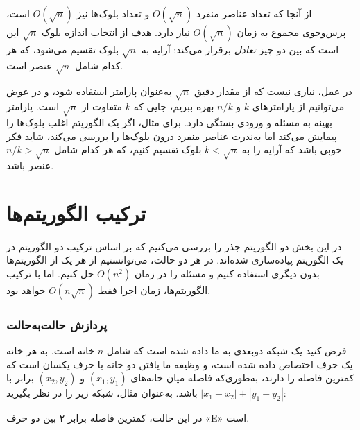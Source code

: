 از آنجا که تعداد عناصر منفرد $O(\sqrt n)$
و تعداد بلوک‌ها نیز $O(\sqrt n)$ است،
پرس‌وجوی مجموع به زمان $O(\sqrt n)$ نیاز دارد.
هدف از انتخاب اندازه بلوک $\sqrt n$ این است
که بین دو چیز \emph{تعادل} برقرار می‌کند:
آرایه به $\sqrt n$ بلوک تقسیم می‌شود،
که هر کدام شامل $\sqrt n$ عنصر است.

در عمل، نیازی نیست که از مقدار دقیق $\sqrt n$
به‌عنوان پارامتر استفاده شود،
و در عوض می‌توانیم از پارامترهای $k$ و $n/k$ بهره ببریم، جایی که $k$
متفاوت از $\sqrt n$ است.
پارامتر بهینه به مسئله و ورودی بستگی دارد.
برای مثال، اگر یک الگوریتم اغلب بلوک‌ها را پیمایش می‌کند
اما به‌ندرت عناصر منفرد درون بلوک‌ها را بررسی می‌کند،
شاید فکر خوبی باشد که آرایه را به
$k < \sqrt n$ بلوک تقسیم کنیم، که هر کدام شامل $n/k > \sqrt n$
عنصر باشد.

\section{ترکیب الگوریتم‌ها}

در این بخش دو الگوریتم جذر را بررسی می‌کنیم
که بر اساس ترکیب دو الگوریتم در یک الگوریتم پیاده‌سازی شده‌اند.
در هر دو حالت، می‌توانستیم از هر یک از الگوریتم‌ها
بدون دیگری استفاده کنیم
و مسئله را در زمان $O(n^2)$ حل کنیم.
اما با ترکیب الگوریتم‌ها، زمان اجرا
فقط $O(n \sqrt n)$ خواهد بود.

\subsubsection{پردازش حالت‌به‌حالت}

فرض کنید یک شبکه دوبعدی به ما داده شده است
که شامل $n$ خانه است.
به هر خانه یک حرف اختصاص داده شده است،
و وظیفه ما یافتن دو خانه
با حرف یکسان است که کمترین فاصله را دارند،
به‌طوری‌که فاصله میان خانه‌های
$(x_1,y_1)$ و $(x_2,y_2)$ برابر با $|x_1-x_2|+|y_1-y_2|$ باشد.
به‌عنوان مثال، شبکه زیر را در نظر بگیرید:

\begin{center}
\end{center}
در این حالت، کمترین فاصله برابر ۲ بین دو حرف «E» است.

